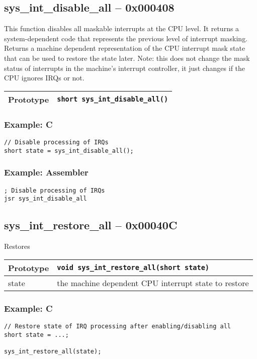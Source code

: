 \subsection*{sys\_int\_disable\_all -- 0x000408}
This function disables all maskable interrupts at the CPU level. It returns a system-dependent code that represents the previous level of interrupt masking. 
Returns a machine dependent representation of the CPU interrupt mask state that can be used to restore the state later.
Note: this does not change the mask status of interrupts in the machine's interrupt controller, it just changes if the CPU ignores IRQs or not.

\bigskip

\begin{tabular}{|l||l|} \hline
Prototype & \lstinline!short sys_int_disable_all()! \\ \hline
\end{tabular}

\subsubsection*{Example: C}
\begin{lstlisting}
// Disable processing of IRQs
short state = sys_int_disable_all();
\end{lstlisting}

\subsubsection*{Example: Assembler}
\begin{verbatim}
; Disable processing of IRQs
jsr sys_int_disable_all
\end{verbatim}


\subsection*{sys\_int\_restore\_all -- 0x00040C}
Restores 

\bigskip

\begin{tabular}{|l||l|} \hline
Prototype & \lstinline!void sys_int_restore_all(short state)! \\ \hline
state & the machine dependent CPU interrupt state to restore
\end{tabular}

\subsubsection*{Example: C}
\begin{lstlisting}
// Restore state of IRQ processing after enabling/disabling all
short state = ...;

sys_int_restore_all(state);
\end{lstlisting}

